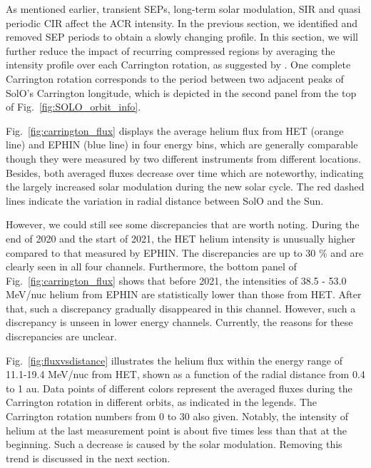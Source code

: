 As mentioned earlier, transient \acp{SEP}, long-term solar modulation, \acs{SIR} and quasi periodic \acs{CIR} affect the \ac{ACR} intensity. In the previous section, we identified and removed \ac{SEP} periods to obtain a slowly changing profile. In this section, we will further reduce the impact of recurring compressed regions by averaging the intensity profile over each Carrington rotation, as suggested by \citet{Rankin2021ApJ}. One complete Carrington rotation corresponds to the period between two adjacent peaks of \ac{SolO}'s Carrington longitude, which is depicted in the second panel from the top of Fig.~\ref{fig:SOLO_orbit_info}.


Fig.~\ref{fig:carrington_flux} displays the average helium flux from \ac{HET} (orange line) and \ac{EPHIN} (blue line) in four energy bins, which are generally comparable though they were measured by two different instruments from different locations. Besides, both averaged fluxes decrease over time which are noteworthy, indicating the largely increased solar modulation during the new solar cycle. The red dashed lines indicate the variation in radial distance between \ac{SolO} and the Sun. 

However, we could still see some discrepancies that are worth noting. During the end of 2020 and the start of 2021, the \ac{HET} helium intensity is unusually higher compared to that measured by \ac{EPHIN}. The discrepancies are up to 30 \% and are clearly seen in all four channels. Furthermore, the bottom panel of Fig.~\ref{fig:carrington_flux} shows that before 2021, the intensities of 38.5 - 53.0 MeV/nuc helium from \ac{EPHIN} are statistically lower than those from \ac{HET}. After that, such a discrepancy gradually disappeared in this channel. However, such a discrepancy is unseen in lower energy channels. Currently, the reasons for these discrepancies are unclear.

Fig.~\ref{fig:fluxvsdistance} illustrates the helium flux within the energy range of 11.1-19.4 MeV/nuc from \ac{HET}, shown as a function of the radial distance from 0.4 to 1 au. Data points of different colors represent the averaged fluxes during the Carrington rotation in different orbits, as indicated in the legends. The Carrington rotation numbers from 0 to 30 also given. Notably, the intensity of helium at the last measurement point is about five times less than that at the beginning. Such a decrease is caused by the solar modulation. Removing this trend is discussed in the next section.

